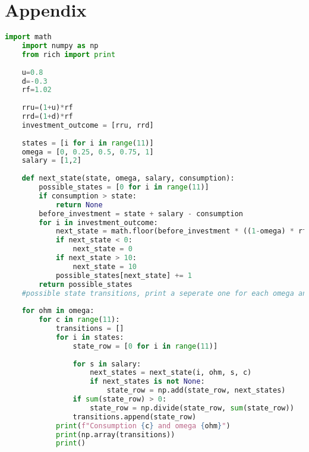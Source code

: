 \documentclass[12pt]{article}
\begin{document}
\section{Appendix}\label{sec:appendix}
\begin{lstlisting}[language=Python,
    basicstyle=\ttfamily\scriptsize,
    caption=Python Implementation of Transition Probabilities, 
    backgroundcolor=\color{gray!10},
    commentstyle=\color{codegreen},
    keywordstyle=\color{magenta}]
    import math
    import numpy as np
    from rich import print
    
    u=0.8
    d=-0.3
    rf=1.02
    
    rru=(1+u)*rf
    rrd=(1+d)*rf
    investment_outcome = [rru, rrd]
    
    states = [i for i in range(11)]
    omega = [0, 0.25, 0.5, 0.75, 1]
    salary = [1,2]
    
    def next_state(state, omega, salary, consumption):
        possible_states = [0 for i in range(11)]
        if consumption > state:
            return None
        before_investment = state + salary - consumption
        for i in investment_outcome:
            next_state = math.floor(before_investment * ((1-omega) * rf +omega * i))
            if next_state < 0:
                next_state = 0
            if next_state > 10:
                next_state = 10
            possible_states[next_state] += 1
        return possible_states
    #possible state transitions, print a seperate one for each omega and each consumption
    
    for ohm in omega:
        for c in range(11):
            transitions = []
            for i in states:
                state_row = [0 for i in range(11)]
    
                for s in salary:
                    next_states = next_state(i, ohm, s, c)
                    if next_states is not None:
                        state_row = np.add(state_row, next_states)
                if sum(state_row) > 0:
                    state_row = np.divide(state_row, sum(state_row))
                transitions.append(state_row)
            print(f"Consumption {c} and omega {ohm}")
            print(np.array(transitions))
            print()
    
    
    
\end{lstlisting}
\end{document}
